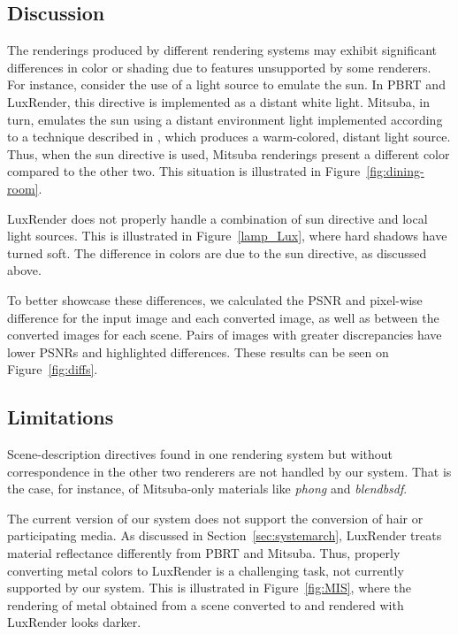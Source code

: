 \subsection{Discussion}
\label{subsec:discussion}

The renderings produced by different rendering systems may exhibit significant differences in color or shading due to features unsupported by some renderers.  
For instance, consider the use of a light source to emulate the sun. In PBRT and LuxRender, this directive is implemented as a distant white light.
Mitsuba, in turn, emulates the sun using a distant environment light implemented according to a technique 
described in \cite{Preetham}, which produces a warm-colored, distant light source. Thus, when the sun directive is used, Mitsuba renderings present a different color compared to the other two. This situation is illustrated in Figure~\ref{fig:dining-room}.

LuxRender does not properly handle a combination of sun directive and local light sources. This is illustrated in Figure~\ref{lamp_Lux}, where hard shadows have turned soft. The difference in colors are due to the sun directive, as discussed above.

To better showcase these differences, we calculated the PSNR and pixel-wise difference for the input image and each converted image, as well as between the converted images for each scene. Pairs of images with greater discrepancies have lower PSNRs and highlighted differences. These results can be seen on Figure~\ref{fig:diffs}.



\subsection{Limitations}
Scene-description directives found in one rendering system but without correspondence in the other two renderers are not handled by our system. That is the case, for instance, of Mitsuba-only materials like \textit{phong} and \textit{blendbsdf}. 

The current version of our system does not support the conversion of hair or participating media. 
%
As discussed in Section~\ref{sec:systemarch}, LuxRender treats material reflectance differently from PBRT and Mitsuba. Thus, properly converting metal colors to LuxRender is a challenging task, not currently supported by our system. This is illustrated in Figure~\ref{fig:MIS}, where the rendering of metal obtained from a scene converted to and rendered with LuxRender looks darker.  

